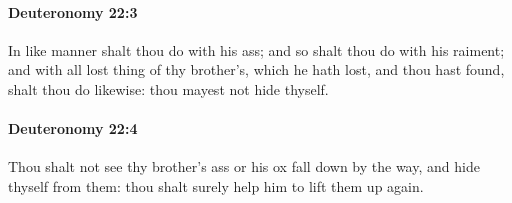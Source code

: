 		\paragraph{Deuteronomy 22:3} %
			\label{DEUTERONOMY-22-3}

			In like manner shalt thou do with his ass; and so shalt thou do with his raiment; and with all lost thing of thy brother's, which he hath lost, and thou hast found, shalt thou do likewise: thou mayest not hide thyself.


		\paragraph{Deuteronomy 22:4} %
			\label{DEUTERONOMY-22-4}

			Thou shalt not see thy brother's ass or his ox fall down by the way, and hide thyself from them: thou shalt surely help him to lift them up again.

